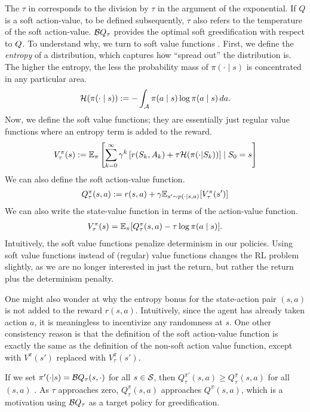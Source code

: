 \documentclass[\main/thesis.tex]{subfiles}
\begin{document}
The $\tau$ in  corresponds to the division by $\tau$ in the argument of the exponential. If $Q$ is a soft action-value, to be defined subsequently, $\tau$ also refers to the temperature of the soft action-value. $\mathcal{B}Q_\tau$ provides the optimal soft greedification with respect to ${Q}$. To understand why, we turn to soft value functions \citep{ziebart2010modeling}. First, we define the \textit{entropy} of a distribution, which captures how ``spread out'' the distribution is. The higher the entropy, the less the probability mass of $\pi(\cdot \mid s)$ is concentrated in any particular area. 
\begin{align*}
    \mathcal{H}(\pi(\cdot \mid s)) := - \int_{\mathcal{A}} \pi(a \mid s) \log \pi(a \mid s)\, da.
\end{align*}
Now, we define the soft value functions; they are essentially just regular value functions where an entropy term is added to the reward. 
\begin{equation*}
    V^{\pi}_\tau(s) :=  \mathbb{E}_\pi\left[ \sum_{k = 0}^\infty \gamma^k \left[ r(S_k, A_k) + \tau \mathcal{H}(\pi(\cdot|S_k))\right] \mid S_0 = s \right] 
\end{equation*}
We can also define the soft action-value function. 
\begin{align*}
    Q^{\pi}_\tau(s,a) :=  r(s, a) + \gamma \mathbb{E}_{s' \sim p(\cdot \mid s, a)}[V^\pi_\tau(s')]
\end{align*}
We can also write the state-value function in terms of the action-value function.
\begin{align*}
    V^\pi_\tau(s) = \mathbb{E}_\pi[Q^\pi_\tau(s, a) - \tau \log \pi(a \mid s)].
\end{align*}
Intuitively, the soft value functions penalize determinism in our policies. Using soft value functions instead of (regular) value functions changes the RL problem slightly, as we are no longer interested in just the return, but rather the return plus the determinism penalty. 

One might also wonder at why the entropy bonus for the state-action pair $(s, a)$ is not added to the reward $r(s, a)$. Intuitively, since the agent has already taken action $a$, it is meaningless to incentivize any randomness at $s$. One other consistency reason is that the definition of the soft action-value function is exactly the same as the definition of the non-soft action value function, except with $V^\pi(s')$ replaced with $V^\pi_\tau(s')$. 

If we set $\pi'(\cdot | s) = \mathcal{B}Q_\tau(s, \cdot)$ for all $s \in \mathcal{S}$, then $Q^{\pi'}_\tau(s,a) \ge Q^{\pi}_\tau(s,a)$ for all $(s,a)$ \citep[Theorem 4]{haarnoja2017reinforcement}. As $\tau$ approaches zero, $Q^{\pi}_\tau(s,a)$ approaches $Q^{\pi}(s,a)$, which is a motivation using $\mathcal{B}Q_\tau$ as a target policy for greedification.
\end{document}
